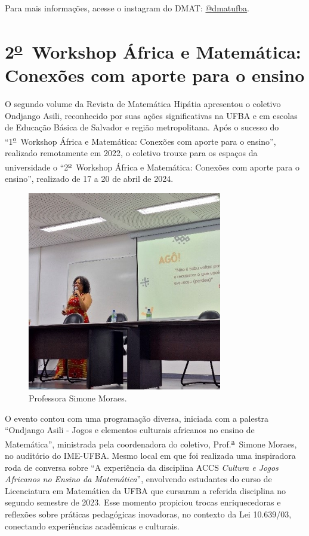 \documentclass{hipatia}
\newcommand{\superau}{\textsuperscript{\underline{a}}~}
\newcommand{\superou}{\textsuperscript{\underline{o}}~}
\begin{document}
Para mais informações, acesse o instagram do DMAT: \href{https://www.instagram.com/dmatufba?igsh=MXJ0NDVjaThwc2IwMQ==}{@dmatufba}.

\section{2\superou Workshop África e Matemática: Conexões com aporte para o ensino } 

O segundo volume da Revista de Matemática Hipátia apresentou o coletivo Ondjango Asili, reconhecido por suas ações significativas na UFBA e em escolas de Educação Básica de Salvador e região metropolitana. Após o sucesso do ``1\superou Workshop África e Matemática: Conexões com aporte para o ensino'', realizado remotamente em 2022, o coletivo trouxe para os espaços da universidade o ``2\superou Workshop África e Matemática: Conexões com aporte para o ensino'', realizado de 17 a 20 de abril de 2024.

\begin{figure}[htb]
    \centering
    \includegraphics[width=8.5cm]{WAM1.jpg}
    \caption{Professora Simone Moraes.}
 \label{WAM1}
\end{figure}

O evento contou com uma programação diversa, iniciada com a palestra ``Ondjango Asili - Jogos e elementos culturais africanos no ensino de Matemática'', ministrada pela coordenadora do coletivo, Prof.\superau Simone Moraes, no auditório do IME-UFBA. Mesmo local em que foi realizada uma inspiradora roda de conversa sobre ``A experiência da disciplina ACCS \textit{Cultura e Jogos Africanos no Ensino da Matemática}'', envolvendo estudantes do curso de Licenciatura em Matemática da UFBA que cursaram a referida disciplina no segundo semestre de 2023. Esse momento propiciou trocas enriquecedoras e reflexões sobre práticas pedagógicas inovadoras, no contexto da Lei 10.639/03, conectando experiências acadêmicas e culturais.
\end{document}
